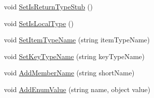 \begin{DoxyCompactItemize}
void \hyperlink{class_e_l_i_client_1_1_e_l_i_client___xaml_type_info_1_1_xaml_user_type_a20f13f430b27304972385249b0ae8613}{Set\+Is\+Return\+Type\+Stub} ()
\item 
void \hyperlink{class_e_l_i_client_1_1_e_l_i_client___xaml_type_info_1_1_xaml_user_type_af6a3dfcb7a63cac842cc635578a7722b}{Set\+Is\+Local\+Type} ()
\item 
void \hyperlink{class_e_l_i_client_1_1_e_l_i_client___xaml_type_info_1_1_xaml_user_type_a85efcc8b7d9e26f390e400af5767d25d}{Set\+Item\+Type\+Name} (string item\+Type\+Name)
\item 
void \hyperlink{class_e_l_i_client_1_1_e_l_i_client___xaml_type_info_1_1_xaml_user_type_a8a9dec2e38ff7e47ce65fab2dbf9346f}{Set\+Key\+Type\+Name} (string key\+Type\+Name)
\item 
void \hyperlink{class_e_l_i_client_1_1_e_l_i_client___xaml_type_info_1_1_xaml_user_type_a7cc17534014002de27e44ac41b40b4c0}{Add\+Member\+Name} (string short\+Name)
\item 
void \hyperlink{class_e_l_i_client_1_1_e_l_i_client___xaml_type_info_1_1_xaml_user_type_afd9db55de0391c8a7216e6bce2f3d675}{Add\+Enum\+Value} (string name, object value)
\end{DoxyCompactItemize}
